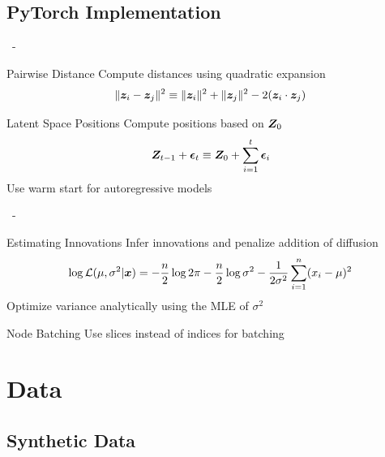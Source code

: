 \documentclass{beamer}
\newenvironment{xframe}
    {\begin{frame}{
        \ifx\insertsubsection\empty
            \strut
        \else\ifx\insertsubsubsection\empty
            \insertsection
        \else
            \insertsection~-~\insertsubsection
        \fi\fi
    }{
        \ifx\insertsubsection\empty
            \insertsection
        \else\ifx\insertsubsubsection\empty
            \insertsubsection
        \else
            \insertsubsubsection
        \fi\fi
    }}
    {\end{frame}}
\newenvironment{xblock}[1]
    {\begin{block}{#1}}
    {\end{block}}
\begin{document}
    \subsection{PyTorch Implementation}
    
    \begin{xframe}
        \begin{xblock}{Pairwise Distance}
            Compute distances using quadratic expansion
            \[\Vert\bm{z}_i-\bm{z}_j\Vert^2\equiv\Vert \bm{z}_i\Vert^2 + \Vert\bm{z}_j\Vert^2 - 2(\bm{z}_i\cdot\bm{z}_j)\]
        \end{xblock}
        
        \begin{xblock}{Latent Space Positions}
            Compute positions based on $\bm{Z}_0$
            \[ \bm{Z}_{t-1} + \bm{\epsilon}_t \equiv \bm{Z}_0 + \sum_{i=1}^t\bm{\epsilon}_i \]
            \onslide<+->
            Use warm start for autoregressive models
        \end{xblock}
    \end{xframe}
    
    \begin{xframe}
        \begin{xblock}{Estimating Innovations}
            Infer innovations and penalize addition of diffusion
            \[\log\mathcal{L}(\mu, \sigma^2\vert \bm{x}) = -\frac{n}{2}\log2\pi - \frac{n}{2}\log\sigma^2 - \frac{1}{2\sigma^2}\sum_{i=1}^n (x_i - \mu)^2\]
            \onslide<+->
            Optimize variance analytically using the MLE of $\sigma^2$
        \end{xblock}
        
        \begin{xblock}{Node Batching}
            Use slices instead of indices for batching
            \onslide<+->
            \begin{center}
                
            \end{center}
        \end{xblock}
    
    \end{xframe}
    
\section{Data}

    \subsection{Synthetic Data}
    
\end{document}
